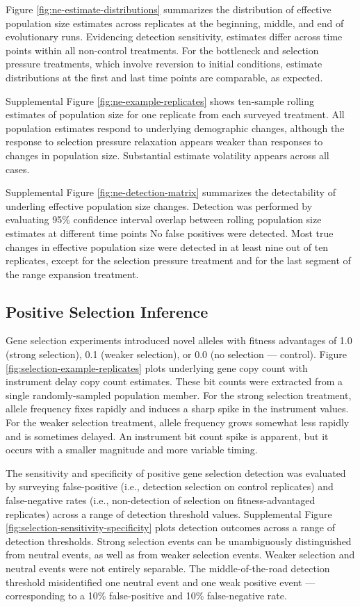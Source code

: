 Figure \ref{fig:ne-estimate-distributions} summarizes the distribution of effective population size estimates across replicates at the beginning, middle, and end of evolutionary runs.
Evidencing detection sensitivity, estimates differ across time points within all non-control treatments.
For the bottleneck and selection pressure treatments, which involve reversion to initial conditions, estimate distributions at the first and last time points are comparable, as expected.

Supplemental Figure \ref{fig:ne-example-replicates} shows ten-sample rolling estimates of population size for one replicate from each surveyed treatment.
All population estimates respond to underlying demographic changes, although the response to selection pressure relaxation appears weaker than responses to changes in population size.
Substantial estimate volatility appears across all cases.

Supplemental Figure \ref{fig:ne-detection-matrix} summarizes the detectability of underling effective population size changes.
Detection was performed by evaluating 95\% confidence interval overlap between rolling population size estimates at different time points
No false positives were detected.
Most true changes in effective population size were detected in at least nine out of ten replicates, except for the selection pressure treatment and for the last segment of the range expansion treatment.

\subsection{Positive Selection Inference}

Gene selection experiments introduced novel alleles with fitness advantages of 1.0 (strong selection), 0.1 (weaker selection), or 0.0 (no selection --- control).
Figure \ref{fig:selection-example-replicates} plots underlying gene copy count with instrument delay copy count estimates.
These bit counts were extracted from a single randomly-sampled population member.
For the strong selection treatment, allele frequency fixes rapidly and induces a sharp spike in the instrument values.
For the weaker selection treatment, allele frequency grows somewhat less rapidly and is sometimes delayed.
An instrument bit count spike is apparent, but it occurs with a smaller magnitude and more variable timing.

The sensitivity and specificity of positive gene selection detection was evaluated by surveying false-positive (i.e., detection selection on control replicates) and false-negative rates (i.e., non-detection of selection on fitness-advantaged replicates) across a range of detection threshold values.
Supplemental Figure \ref{fig:selection-sensitivity-specificity} plots detection outcomes across a range of detection thresholds.
Strong selection events can be unambiguously distinguished from neutral events, as well as from weaker selection events.
Weaker selection and neutral events were not entirely separable.
The middle-of-the-road detection threshold misidentified one neutral event and one weak positive event --- corresponding to a 10\% false-positive and 10\% false-negative rate.
